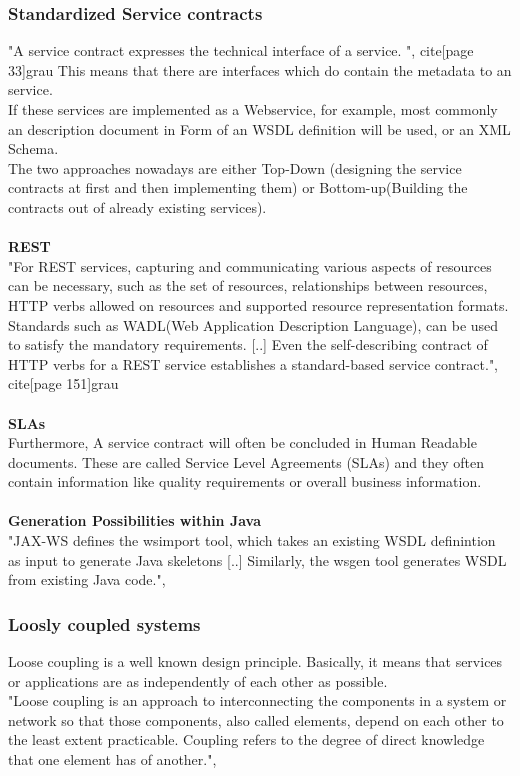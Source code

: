 \documentclass[12pt]{article}
\begin{document}
\subsubsection{Standardized Service contracts}
"A service contract expresses the technical interface of a service. ", cite[page 33]{grau} This means that there are interfaces which do contain the metadata to an service.  \\ If these services are implemented as a Webservice, for example, most commonly an description document in Form of an WSDL definition will be used, or an XML Schema. \\
The two approaches nowadays are either Top-Down (designing the service contracts at first and then implementing them) or Bottom-up(Building the contracts out of already existing services). \cite[page 151,152]{grau}
\\ \\
\textbf{REST}\\
"For REST services, capturing and communicating various aspects of resources can be necessary, such as the set of resources, relationships between resources, HTTP verbs allowed on resources and supported resource representation formats. Standards such as WADL(Web Application Description Language), can be used to satisfy the mandatory requirements. [..] Even the self-describing contract of HTTP verbs for a REST service establishes a standard-based service contract.", cite[page 151]{grau}
\\ \\
\textbf{SLAs} \\
Furthermore, A service contract will often be concluded in Human Readable documents. These are called Service Level Agreements (SLAs) and they often contain information like quality requirements or overall business information. %
\\ \\
\textbf{Generation Possibilities within Java} \\
"JAX-WS defines the wsimport tool, which takes an existing WSDL definintion as input to generate Java skeletons [..] Similarly, the wsgen tool generates WSDL from existing Java code.",\cite[page 151]{grau}
\\
\subsubsection{Loosly coupled systems}
Loose coupling is a well known design principle. Basically, it means that services or applications are as independently of each other as possible.\\
"Loose coupling is an approach to interconnecting the components in a system or network so that those components, also called elements, depend on each other to the least extent practicable. Coupling refers to the degree of direct knowledge that one element has of another.", \cite{loosecoupldef}
\end{document}
